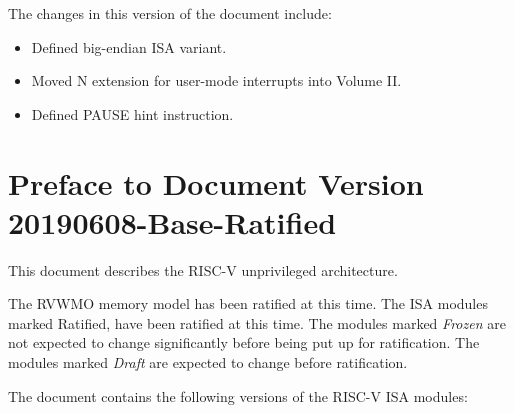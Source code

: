 The changes in this version of the document include:
\vspace{-0.2in}
\begin{itemize}
\parskip 0pt
\itemsep 1pt
\item Defined big-endian ISA variant.
\item Moved N extension for user-mode interrupts into Volume II.
\item Defined PAUSE hint instruction.
\end{itemize}

\section*{Preface to Document Version 20190608-Base-Ratified}

This document describes the RISC-V unprivileged architecture.  

The RVWMO memory model has been ratified at this time.  The ISA
modules marked Ratified, have been ratified at this time.  The modules
marked {\em Frozen} are not expected to change significantly before
being put up for ratification.  The modules marked {\em Draft} are
expected to change before ratification.

The document contains the following versions of the RISC-V ISA
modules:

